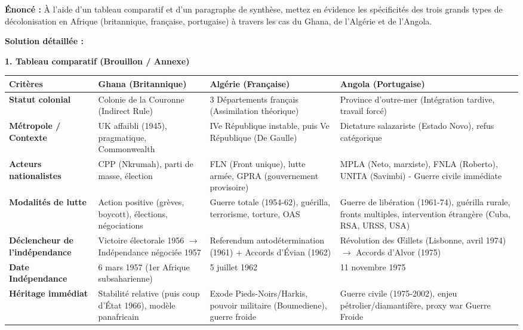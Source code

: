 \documentclass[11pt]{article}
\newcommand{\cle}[1]{{\popxbold\color{popdark}#1}}
\begin{document}
\begin{exoresolu}
\textbf{Énoncé :} À l'aide d'un tableau comparatif et d'un paragraphe de synthèse, mettez en évidence les spécificités des trois grands types de décolonisation en Afrique (britannique, française, portugaise) à travers les cas du Ghana, de l'Algérie et de l'Angola.

\tcblower
\textbf{Solution détaillée :}

\textbf{1. Tableau comparatif (Brouillon / Annexe)}

\begin{center}
\begin{tabularx}{\linewidth}{|l|X|X|X|}\hline
\rowcolor{popblueL}
\textbf{Critères} & \textbf{Ghana (Britannique)} & \textbf{Algérie (Française)} & \textbf{Angola (Portugaise)} \\ \hline
\textbf{Statut colonial} & Colonie de la Couronne (Indirect Rule) & 3 Départements français (Assimilation théorique) & Province d'outre-mer (Intégration tardive, travail forcé) \\ \hline
\textbf{Métropole / Contexte} & UK affaibli (1945), pragmatique, Commonwealth & IVe République instable, puis Ve République (De Gaulle) & Dictature salazariste (Estado Novo), refus catégorique \\ \hline
\textbf{Acteurs nationalistes} & \cle{CPP} (Nkrumah), parti de masse, élection & \cle{FLN} (Front unique), lutte armée, GPRA (gouvernement provisoire) & \cle{MPLA} (Neto, marxiste), \cle{FNLA} (Roberto), \cle{UNITA} (Savimbi) - Guerre civile immédiate \\ \hline
\textbf{Modalités de lutte} & \cle{Action positive} (grèves, boycott), élections, négociations & \cle{Guerre totale} (1954-62), guérilla, terrorisme, torture, OAS & \cle{Guerre de libération} (1961-74), guérilla rurale, fronts multiples, intervention étrangère (Cuba, RSA, URSS, USA) \\ \hline
\textbf{Déclencheur de l'indépendance} & Victoire électorale 1956 $\to$ Indépendance négociée 1957 & Referendum autodétermination (1961) + Accords d'Évian (1962) & \cle{Révolution des Œillets} (Lisbonne, avril 1974) $\to$ Accords d'Alvor (1975) \\ \hline
\textbf{Date Indépendance} & 6 mars 1957 (1er Afrique subsaharienne) & 5 juillet 1962 & 11 novembre 1975 \\ \hline
\textbf{Héritage immédiat} & Stabilité relative (puis coup d'État 1966), modèle panafricain & Exode Pieds-Noirs/Harkis, pouvoir militaire (Boumediene), guerre froide & \cle{Guerre civile} (1975-2002), enjeu pétrolier/diamantifère, proxy war Guerre Froide \\ \hline
\end{tabularx}
\end{center}


\end{exoresolu}
\end{document}
